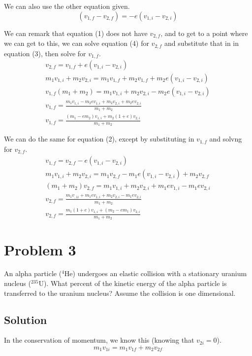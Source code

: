 \documentclass[12pt]{article}
\begin{document}
We can also use the other equation given.
\begin{equation}
    (v_{1,f} - v_{2,f}) = -e(v_{1,i} - v_{2,i})
\end{equation}

We can remark that equation (1) does not have $v_{2,f}$, and to get to a point where we can get to this, we can solve equation (4) for $v_{2,f}$ and substitute that in in equation (3), then solve for $v_{1,f}$.
\begin{gather}
    v_{2,f} = v_{1,f} + e(v_{1,i} - v_{2,i})\\
    m_1v_{1,i} + m_2v_{2,i} = m_1v_{1,f} + m_2v_{1,f} + m_2e(v_{1,i} - v_{2,i})\\
    v_{1,f}(m_1 + m_2) = m_1v_{1,i} + m_2v_{2,i} - m_2e(v_{1,i} - v_{2,i})\\
    v_{1,f} = \frac{m_1v_{1,i} - m_2ev_{1,i} + m_2v_{2,i} + m_2ev_{2,i}}{m_1 + m_2}\\
    v_{1,f} = \frac{(m_1 - em_2)v_{1,i} + m_2(1+e)v_{2,i}}{m_1 + m_2}
\end{gather}

We can do the same for equation (2), except by substituting in $v_{1,f}$ and solvng for $v_{2,f}$.
\begin{gather}
    v_{1,f} = v_{2,f} - e(v_{1,i} - v_{2,i})\\
    m_1v_{1,i} + m_2v_{2,i} = m_1v_{2,f} - m_1e(v_{1,i} - v_{2,i}) + m_2v_{2,f}\\
    (m_1 + m_2)v_{2,f} = m_1v_{1,i} + m_2v_{2,i} + m_1ev_{1,i} - m_1ev_{2,i}\\
    v_{2,f} = \frac{m_1v_{,1i} + m_1ev_{1,i} + m_2v_{2,i} - m_1ev_{2,i}}{m_1 + m_2}\\
    v_{2,f} = \frac{m_1(1 + e)v_{1,i} + (m_2 - em_1)v_{2,i}}{m_1 + m_2}
\end{gather}


\pagebreak
\section*{Problem 3}
An alpha particle ($^4$He) undergoes an elastic collision with a stationary uranium nucleus ($^{235}$U). What percent of the kinetic energy of the alpha particle is transferred to the uranium nucleus? Assume the collision is one dimensional.

\subsection*{Solution}
In the conservation of momentum, we know this (knowing that $v_{2i} = 0$).
\begin{equation}
    m_1v_{1i} = m_1v_{1f} + m_2v_{2f}
\end{equation}
\end{document}
